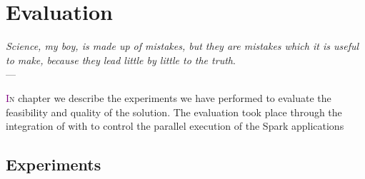 \chapter{Evaluation} \label{chap:Evaluation}
\begin{flushright}{\slshape    
   Science, my boy, is made up of mistakes, but they are mistakes
   which it is useful to make, because they lead little by little
   to the truth}. \\ \medskip --- \citeauthor{verne_journey:1957}
    \citeyear{verne_journey:1957}
\end{flushright} 

\lettrine[lines=4]{\textcolor{purple}{I}}{n} chapter we describe the experiments we have performed to evaluate the feasibility and quality of the solution.
The evaluation took place through the integration of \dSymb with \cSpark to control the parallel execution of the Spark applications
\section{Experiments}\label{sec:experiments}

